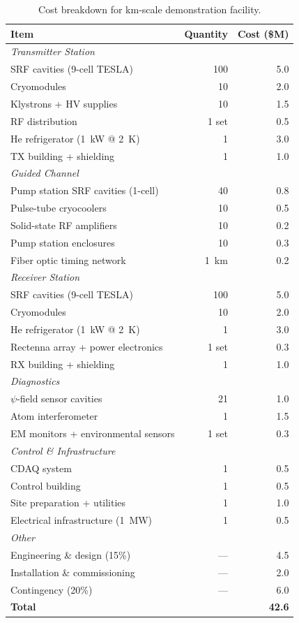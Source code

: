 \documentclass[11pt,letterpaper]{article}
\begin{document}
\begin{table}[H]
\caption{Cost breakdown for km-scale demonstration facility.}
\begin{tabular}{lrr}
\toprule
Item & Quantity & Cost (\$M) \\
\midrule
\multicolumn{3}{l}{\textit{Transmitter Station}} \\
\quad SRF cavities (9-cell TESLA) & 100 & 5.0 \\
\quad Cryomodules & 10 & 2.0 \\
\quad Klystrons + HV supplies & 10 & 1.5 \\
\quad RF distribution & 1 set & 0.5 \\
\quad He refrigerator (1~kW @ 2~K) & 1 & 3.0 \\
\quad TX building + shielding & 1 & 1.0 \\
\midrule
\multicolumn{3}{l}{\textit{Guided Channel}} \\
\quad Pump station SRF cavities (1-cell) & 40 & 0.8 \\
\quad Pulse-tube cryocoolers & 10 & 0.5 \\
\quad Solid-state RF amplifiers & 10 & 0.2 \\
\quad Pump station enclosures & 10 & 0.3 \\
\quad Fiber optic timing network & 1~km & 0.2 \\
\midrule
\multicolumn{3}{l}{\textit{Receiver Station}} \\
\quad SRF cavities (9-cell TESLA) & 100 & 5.0 \\
\quad Cryomodules & 10 & 2.0 \\
\quad He refrigerator (1~kW @ 2~K) & 1 & 3.0 \\
\quad Rectenna array + power electronics & 1 set & 0.3 \\
\quad RX building + shielding & 1 & 1.0 \\
\midrule
\multicolumn{3}{l}{\textit{Diagnostics}} \\
\quad $\psi$-field sensor cavities & 21 & 1.0 \\
\quad Atom interferometer & 1 & 1.5 \\
\quad EM monitors + environmental sensors & 1 set & 0.3 \\
\midrule
\multicolumn{3}{l}{\textit{Control \& Infrastructure}} \\
\quad CDAQ system & 1 & 0.5 \\
\quad Control building & 1 & 0.5 \\
\quad Site preparation + utilities & 1 & 1.0 \\
\quad Electrical infrastructure (1~MW) & 1 & 0.5 \\
\midrule
\multicolumn{3}{l}{\textit{Other}} \\
\quad Engineering \& design (15\%) & --- & 4.5 \\
\quad Installation \& commissioning & --- & 2.0 \\
\quad Contingency (20\%) & --- & 6.0 \\
\midrule
\textbf{Total} & & \textbf{42.6} \\
\bottomrule
\end{tabular}
\end{table}
\end{document}
